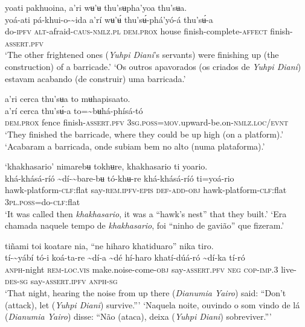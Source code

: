 \documentclass[output=paper,
modfonts,nonflat
]{langsci/langscibook}
\begin{document}
\ea yoati pakhuoina, a’ri wʉ'ʉ thu'sʉpha’yoa thu'sʉa. \\[.3em]
\gll yoá-ati	pá-khui-o{\footnotemark}-{\textasciitilde}ida	a’rí	wʉ'ʉ́	thu'sʉ́-phá'yó-á	thu'sʉ́-a \\
     do-\textsc{ipfv}	\textsc{alt}-afraid-\textsc{caus-nmlz.pl}	\textsc{dem.prox}	house	finish-complete-\textsc{affect}	finish-\textsc{assert.pfv}\\
\glt ‘The other frightened ones (\textit{Yuhpi Diani}’s servants) were finishing up (the construction) of a barricade.’
\glt ‘Os outros apavorados (os criados de \textit{Yuhpi Diani}) estavam acabando (de construir) uma barricada.’
\z

 
\ea a’ri cerca thu'sʉa to mʉhapisaato.\\[.3em]
\gll a’rí	cerca{\footnotemark}	thu'sʉ́-a	to={\textasciitilde}bʉhá-phísá-tó\\
     \textsc{dem.prox}	fence	finish-\textsc{assert.pfv}	3\textsc{sg.poss}=\textsc{mov.}upward-be.on-\textsc{nmlz.loc/evnt}\\
\glt ‘They finished the barricade, where they could be up high (on a platform).'
\glt ‘Acabaram a barricada, onde subiam bem no alto (numa plataforma).'
\z 

\ea ‘khakhasario’ nimarebʉ tokhʉre, khakhasario ti yoario. \\[.3em]
\gll khá-khásá-ríó	{\textasciitilde}dí-{\textasciitilde}bare-bʉ	tó-khʉ-re	khá-khásá-ríó	ti=yoá-rio \\
     hawk-platform-\textsc{clf:}flat	say\textsc{-rem.ipfv-epis}	\textsc{def-add-obj}	hawk-platform-\textsc{clf:}flat	3\textsc{pl.poss}=do-\textsc{clf:}flat\\
\glt ‘It was called then \textit{khakhasario}, it was a “hawk's nest” that they built.’
\glt ‘Era chamada naquele tempo de \textit{khakhasario}, foi “ninho de gavião” que fizeram.’
\z 

\largerpage
\ea tiñami toi koatare nia, “ne hiharo khatiduaro” nika tiro.  \\[.3em]
\gll tí-{\textasciitilde}yábí	tó-i	koá-ta-re	{\textasciitilde}dí-a	{\textasciitilde}dé	hí-haro{\footnotemark}	khatí-dúá-ró {\textasciitilde}dí-ka	tí-ró\\
     \textsc{anph}-night	\textsc{rem-loc.vis}	make.noise-come\textsc{-obj}	say-\textsc{assert.pfv}	\textsc{neg}	\textsc{cop-imp.3}	live-\textsc{des-sg} say-\textsc{assert.ipfv}	\textsc{anph-sg} \\     
\glt ‘That night, hearing the noise from up there (\textit{Dianumia Yairo}) said: “Don't (attack), let (\textit{Yuhpi Diani}) survive.”’ 
\glt ‘Naquela noite, ouvindo o som vindo de lá (\textit{Dianumia Yairo}) disse: “Não (ataca), deixa (\textit{Yuhpi Diani}) sobreviver.”’ 
\z
\end{document}
